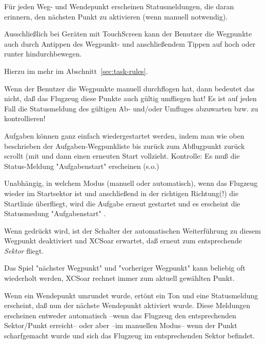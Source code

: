 Für jeden Weg- und Wendepunkt erscheinen Statusmeldungen, die daran erinnern, den nächsten Punkt zu aktivieren (wenn manuell notwendig).

Ausschließlich bei Geräten mit TouchScreen kann der Benutzer die Wegpunkte auch durch Antippen des Wegpunkt-{\InfoBox} und anschließendem Tippen auf hoch oder runter hindurchbewegen.

Hierzu im mehr im Abschnitt~\ref{sec:task-rules}.

\warning Wenn der Benutzer die Wegpunkte  manuell durchflogen hat, dann bedeutet das nicht, daß das Flugzeug diese Punkte auch gültig umfliegen hat! Es ist auf jeden Fall die Statusmeldung des gültigen Ab- und/oder Umfluges abzuwarten bzw. zu kontrollieren!


\tip Aufgaben können ganz einfach wiedergestartet  werden, indem man wie oben beschrieben der Aufgaben-Wegpunkliste bis zurück zum Abflugpunkt zurück scrollt (mit  und dann einen erneuten Start vollzieht. Kontrolle: Es muß die Status-Meldung "Aufgabenstart" erscheinen (s.o.)

Unabhängig, in welchem Modus (manuell oder automatisch), wenn das Flugzeug wieder im Startsektor ist und anschließend in der \textcolor[rgb]{0.00,0.00,0.50}{richtigen Richtung(!)} die Startlinie überfliegt, wird die Aufgabe erneut gestartet und es erscheint die Statusmedung  "Aufgabenstart" .


Wenn  gedrückt wird, ist der Schalter der automatischen Weiterführung zu diesem Wegpunkt deaktiviert und \textsf{XCSoar} erwartet, daß erneut zum entsprechende \textsl{Sektor} fliegt.

Das Spiel "nächster Wegpunkt" und "vorheriger Wegpunkt" kann  beliebig oft wiederholt werden, \textsf{XCSoar} rechnet immer zum aktuell gewählten Punkt.

Wenn ein Wendepunkt umrundet  wurde, ertönt ein Ton und eine Statusmeldung erscheint, daß nun  der nächste Wendepunkt aktiviert wurde. Diese Meldungen erscheinen entweder automatisch --wenn das Flugzeug den entsprechenden Sektor/Punkt erreicht--  oder aber --im manuellen Modus-- wenn der Punkt scharfgemacht wurde und sich das Flugzeug im entsprechenden Sektor befindet.

